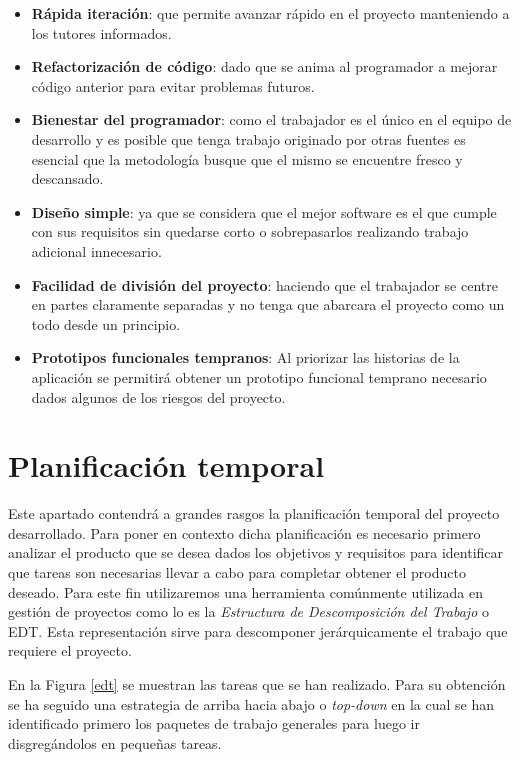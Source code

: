 \begin{itemize}
	\item \textbf{Rápida iteración}: que permite avanzar rápido en el proyecto manteniendo a los tutores informados.
	\item \textbf{Refactorización de código}: dado que se anima al programador a mejorar código anterior para evitar problemas futuros.
	\item \textbf{Bienestar del programador}: como el trabajador es el único en el equipo de desarrollo y es posible que tenga trabajo originado por otras fuentes es esencial que la metodología busque que el mismo se encuentre fresco y descansado.
	\item \textbf{Diseño simple}: ya que se considera que el mejor software es el que cumple con sus requisitos sin quedarse corto o sobrepasarlos realizando trabajo adicional innecesario.
	\item \textbf{Facilidad de división del proyecto}: haciendo que el trabajador se centre en partes claramente separadas y no tenga que abarcara el proyecto como un todo desde un principio.
	\item \textbf{Prototipos funcionales tempranos}: Al priorizar las historias de la aplicación se permitirá obtener un prototipo funcional temprano necesario dados algunos de los riesgos del proyecto.
\end{itemize}


\section{Planificación temporal}

Este apartado contendrá a grandes rasgos la planificación temporal del proyecto desarrollado. Para poner en contexto dicha planificación es necesario primero analizar el producto que se desea dados los objetivos y requisitos para identificar que tareas son necesarias llevar a cabo para completar obtener el producto deseado. Para este fin utilizaremos una herramienta comúnmente utilizada en gestión de proyectos como lo es la \textit{Estructura de Descomposición del Trabajo} o EDT. Esta representación sirve para descomponer jerárquicamente el trabajo que requiere el proyecto.

\bigskip

En la Figura \ref{edt} se muestran las tareas que se han realizado. Para su obtención se ha seguido una estrategia de arriba hacia abajo o \textit{top-down} en la cual se han identificado primero los paquetes de trabajo generales para luego ir disgregándolos en pequeñas tareas.

